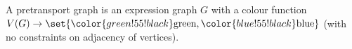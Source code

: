 \documentclass[./Thick_TQFTs_and_Quantum_Information.tex]{subfiles}
\begin{document}
%
%
%
%


\begin{defn}
A pretransport graph is an expression graph $G$ with a colour function
$V(G) \to \set{{\color{green!55!black}\text{green}},
{\color{blue!55!black}\text{blue}}}$ (with no constraints on adjacency of
vertices).
\end{defn}
\end{document}
